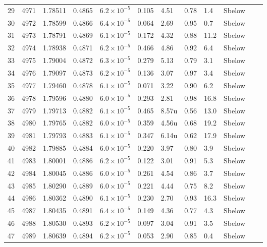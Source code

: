 \begin{longtable}{@{}rrllllllllll@{}}
 29 & 4971 & 1.78511 & 0.4865 & $6.2\times10^{-5}$ & 0.105 & 4.51 & 0.78 & 1.4 & Sbelow &  &  \\
 30 & 4972 & 1.78599 & 0.4866 & $6.4\times10^{-5}$ & 0.064 & 2.69 & 0.95 & 0.7 & Sbelow &  &  \\
 31 & 4973 & 1.78791 & 0.4869 & $6.1\times10^{-5}$ & 0.172 & 4.32 & 0.88 & 11.2 & Sbelow &  &  \\
 32 & 4974 & 1.78938 & 0.4871 & $6.2\times10^{-5}$ & 0.466 & 4.86 & 0.92 & 6.4 & Sbelow &  &  \\
 33 & 4975 & 1.79004 & 0.4872 & $6.3\times10^{-5}$ & 0.279 & 5.13 & 0.79 & 3.1 & Sbelow &  &  \\
 34 & 4976 & 1.79097 & 0.4873 & $6.2\times10^{-5}$ & 0.136 & 3.07 & 0.97 & 3.4 & Sbelow &  &  \\
 35 & 4977 & 1.79460 & 0.4878 & $6.1\times10^{-5}$ & 0.071 & 3.22 & 0.90 & 6.2 & Sbelow &  &  \\
 36 & 4978 & 1.79596 & 0.4880 & $6.0\times10^{-5}$ & 0.293 & 2.81 & 0.98 & 16.8 & Sbelow &  &  \\
 37 & 4979 & 1.79713 & 0.4882 & $6.1\times10^{-5}$ & 0.465 & 8.57u & 0.56 & 13.0 & Sbelow &  &  \\
 38 & 4980 & 1.79765 & 0.4882 & $6.0\times10^{-5}$ & 0.359 & 4.56u & 0.68 & 19.2 & Sbelow &  &  \\
 39 & 4981 & 1.79793 & 0.4883 & $6.1\times10^{-5}$ & 0.347 & 6.14u & 0.62 & 17.9 & Sbelow &  &  \\
 40 & 4982 & 1.79885 & 0.4884 & $6.0\times10^{-5}$ & 0.220 & 3.97 & 0.80 & 3.9 & Sbelow &  &  \\
 41 & 4983 & 1.80001 & 0.4886 & $6.2\times10^{-5}$ & 0.122 & 3.01 & 0.91 & 5.3 & Sbelow &  &  \\
 42 & 4984 & 1.80045 & 0.4886 & $6.0\times10^{-5}$ & 0.261 & 4.54 & 0.86 & 3.7 & Sbelow &  &  \\
 43 & 4985 & 1.80290 & 0.4889 & $6.0\times10^{-5}$ & 0.221 & 4.44 & 0.75 & 8.2 & Sbelow &  &  \\
 44 & 4986 & 1.80362 & 0.4890 & $6.1\times10^{-5}$ & 0.230 & 2.70 & 0.93 & 16.3 & Sbelow &  &  \\
 45 & 4987 & 1.80435 & 0.4891 & $6.4\times10^{-5}$ & 0.149 & 4.36 & 0.77 & 4.3 & Sbelow &  &  \\
 46 & 4988 & 1.80530 & 0.4893 & $6.2\times10^{-5}$ & 0.097 & 3.04 & 0.91 & 3.5 & Sbelow &  &  \\
 47 & 4989 & 1.80639 & 0.4894 & $6.2\times10^{-5}$ & 0.053 & 2.90 & 0.85 & 0.4 & Sbelow &  &  \\

\end{longtable}
